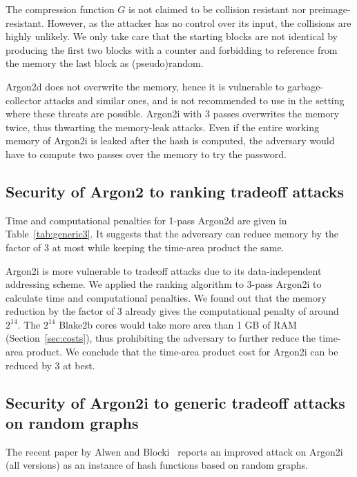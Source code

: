 \documentclass[a4paper]{article}
\begin{document}
 The compression function $G$ is not claimed to be collision resistant nor preimage-resistant. However, as the attacker has no control over its input, the collisions are highly unlikely. We only take care that the starting blocks are not identical by producing the first two blocks with a counter and forbidding to reference from the memory the last block as (pseudo)random.

\textsf{Argon2d} does not overwrite the memory, hence it is vulnerable to garbage-collector attacks and similar ones, and is not recommended to use in the setting where these threats are possible. \textsf{Argon2i} with 3 passes overwrites the memory twice, thus thwarting the memory-leak attacks. Even if the entire working memory of \textsf{Argon2i} is leaked after the hash is computed, the adversary would have to compute two passes over the memory to try the password.



\subsection{Security of Argon2 to ranking tradeoff attacks}

Time and computational penalties for 1-pass \textsf{Argon2d} are given in Table~\ref{tab:generic3}. It suggests that the adversary can reduce memory by the factor of 3 at most
while keeping the time-area product the same.


\textsf{Argon2i} is more vulnerable to tradeoff attacks due to its data-independent addressing scheme. We applied the ranking algorithm to 3-pass \textsf{Argon2i} to calculate time and computational penalties. We found out  that the memory reduction by the factor of 3 already gives the computational penalty of around $2^{14}$.  The $2^{14}$ Blake2b cores would take more area than 1 GB of RAM (Section~\ref{sec:costs}), thus prohibiting the adversary to further reduce the time-area product. We conclude that the time-area product cost for \textsf{Argon2i} can be reduced by 3 at best.

\subsection{Security of Argon2i to generic tradeoff attacks on random graphs}

The recent paper by Alwen and Blocki~\cite{AB16} reports an improved attack on Argon2i (all versions)  as an instance of
hash functions based on random graphs. 
\end{document}
